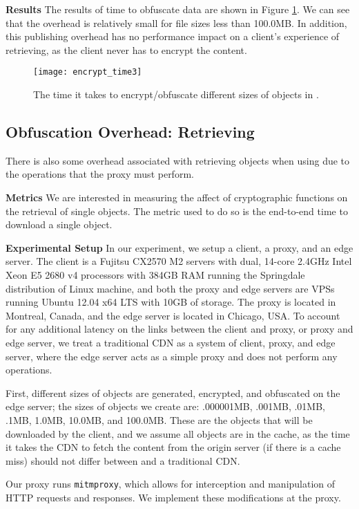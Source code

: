 {\bf Results}
The results of time to obfuscate data are shown in Figure \ref{fig:encrypt_time}.  We can see that the overhead 
is relatively small for file sizes less than 100.0MB.  In addition, this publishing overhead has no performance impact 
on a client's experience of retrieving, as the client never has to encrypt the content.  

\begin{figure}[t]
\centering
\texttt{[image: encrypt\_time3]}
\caption{The time it takes to encrypt/obfuscate different sizes of objects in \system{}.}
\label{fig:encrypt_time}
\end{figure}

\subsection{Obfuscation Overhead: Retrieving}
There is also some overhead associated with retrieving objects when using \system{} due to the operations that 
the proxy must perform.  

{\bf Metrics}
We are interested in measuring the affect of cryptographic functions on the retrieval of single 
objects.  The metric used to do so is the end-to-end time to download a single object.  

{\bf Experimental Setup}
In our experiment, we setup a client, a proxy, and an edge server.  The client is a  Fujitsu CX2570 M2 servers with dual, 
14-core 2.4GHz Intel Xeon E5 2680 v4 processors with 384GB RAM running the Springdale distribution of Linux machine, 
and both the proxy and edge servers are VPSs running Ubuntu 12.04 x64 LTS with 10GB of storage. The proxy is located in 
Montreal, Canada, and the edge server is located in Chicago, USA.  To account for any additional latency on the links between 
the client and proxy, or proxy and edge server, we treat a traditional CDN as a system of client, proxy, and edge server, where 
the edge server acts as a simple proxy and does not perform any operations.  

First, different sizes of objects are generated, encrypted, and obfuscated on the edge server; the sizes of objects we create are: 
.000001MB, .001MB, .01MB, .1MB, 1.0MB, 10.0MB, and 100.0MB.  These are the objects that will be downloaded by the client, and we 
assume all objects are in the cache, as the time it takes the CDN to fetch the content from the origin server (if there is a cache 
miss) should not differ between \system{} and a traditional CDN. 

Our proxy runs {\tt mitmproxy}, which allows for interception and manipulation of HTTP requests and responses.  We implement 
these modifications at the proxy.  


